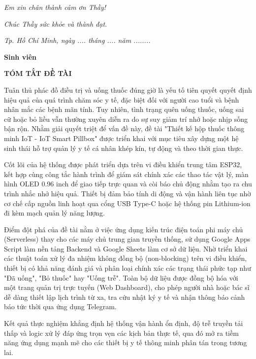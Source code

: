 \documentclass[12pt, a4paper, oneside]{article}
\begin{document}
\textit{Em xin chân thành cảm ơn Thầy!}

\textit{Chúc Thầy sức khỏe và thành đạt.}

\vspace{4cm}

\hspace{5cm}\textit{Tp. Hồ Chí Minh, ngày .... tháng .... năm ........}

\hspace{8cm}\textbf{Sinh viên}

\newpage
\thispagestyle{empty}
\begin{center}
    \textbf{TÓM TẮT ĐỀ TÀI}
\end{center}

Tuân thủ phác đồ điều trị và uống thuốc đúng giờ là yếu tố tiên quyết quyết định hiệu quả của quá trình chăm sóc y tế, đặc biệt đối với người cao tuổi và bệnh nhân mắc các bệnh mãn tính. Tuy nhiên, tình trạng quên uống thuốc, uống sai cữ hoặc bỏ liều vẫn thường xuyên diễn ra do sự suy giảm trí nhớ hoặc nhịp sống bận rộn. Nhằm giải quyết triệt để vấn đề này, đề tài "Thiết kế hộp thuốc thông minh IoT - IoT Smart Pillbox" được triển khai với mục tiêu xây dựng một hệ sinh thái hỗ trợ quản lý y tế cá nhân khép kín, tự động và theo thời gian thực. 

Cốt lõi của hệ thống được phát triển dựa trên vi điều khiển trung tâm ESP32, kết hợp cùng công tắc hành trình để giám sát chính xác các thao tác vật lý, màn hình OLED 0.96 inch để giao tiếp trực quan và còi báo chủ động nhằm tạo ra chu trình nhắc nhở hiệu quả. Thiết bị đảm bảo tính di động và vận hành liên tục nhờ cơ chế cấp nguồn linh hoạt qua cổng USB Type-C hoặc hệ thống pin Lithium-ion đi kèm mạch quản lý năng lượng. 

Điểm đột phá của đề tài nằm ở việc ứng dụng kiến trúc điện toán phi máy chủ (Serverless) thay cho các máy chủ trung gian truyền thống, sử dụng Google Apps Script làm nền tảng Backend và Google Sheets làm cơ sở dữ liệu. Nhờ triển khai các thuật toán xử lý đa nhiệm không đồng bộ (non-blocking) trên vi điều khiển, thiết bị có khả năng đánh giá và phân loại chính xác các trạng thái phức tạp như "Đã uống", "Bỏ thuốc" hay "Uống trễ". Toàn bộ dữ liệu được đồng bộ hóa với một trang quản trị trực tuyến (Web Dashboard), cho phép người nhà hoặc bác sĩ dễ dàng thiết lập lịch trình từ xa, tra cứu nhật ký y tế và nhận thông báo cảnh báo tức thời qua ứng dụng Telegram. 

Kết quả thực nghiệm khẳng định hệ thống vận hành ổn định, độ trễ truyền tải thấp và logic xử lý đáp ứng trọn vẹn các kịch bản thực tế, qua đó mở ra tiềm năng ứng dụng mạnh mẽ cho các thiết bị y tế thông minh phân tán trong tương lai.
\end{document}

